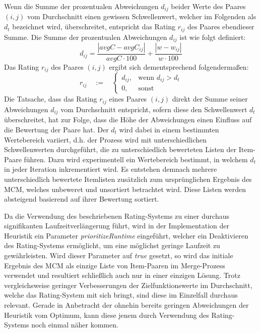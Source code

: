 Wenn die Summe der prozentualen Abweichungen $d_{ij}$ beider Werte des Paares $(i, j)$ vom Durchschnitt einen gewissen Schwellenwert,
welcher im Folgenden als  $d_t$ bezeichnet wird,
überschreitet, entspricht das Rating $r_{ij}$ des Paares ebendieser Summe.
Die Summe der prozentualen Abweichungen $d_{ij}$ ist wie folgt definiert:
\[ d_{ij} = \frac{|avgC - avgC_{ij}|}{avgC \cdot 100} + \frac{|w - w_{ij}|}{w \cdot 100}\]
Das Rating $r_{ij}$ des Paares $(i, j)$ ergibt sich dementsprechend folgendermaßen:
\[
    r_{ij} \quad := \quad
\begin{cases}
    d_{ij}, & \text{wenn $d_{ij} > d_t$}\\
    0, & \text{sonst}
\end{cases}
\]
Die Tatsache, dass das Rating $r_{ij}$ eines Paares $(i, j)$ direkt der Summe seiner Abweichungen $d_{ij}$
vom Durchschnitt entspricht, sofern diese den Schwellenwert $d_t$ überschreitet, hat zur Folge, dass die Höhe der Abweichungen
einen Einfluss auf die Bewertung der Paare hat. Der  $d_t$ wird dabei in einem bestimmten Wertebereich variiert, d.h. der Prozess wird mit unterschiedlichen Schwellenwerten durchgeführt, die zu unterschiedlich bewerteten Listen der Item-Paare führen. Dazu wird experimentell ein Wertebereich bestimmt, in welchem $d_t$ in jeder Iteration inkrementiert wird.
Es entstehen demnach mehrere unterschiedlich bewertete Itemlisten zusätzlich zum ursprünglichen Ergebnis des \textsc{MCM},
welches unbeweret und unsortiert betrachtet wird. Diese Listen werden absteigend basierend auf ihrer Bewertung sortiert.

\vfill
\pagebreak

Da die Verwendung des beschriebenen Rating-Systems zu einer durchaus signifikanten Laufzeitverlängerung führt,
wird in der Implementation der Heuristik ein Parameter \textit{prioritizeRuntime} eingeführt, welcher ein Deaktivieren des
Rating-Systems ermöglicht, um eine möglichst geringe Laufzeit zu gewährleisten. Wird dieser Parameter auf \textit{true}
gesetzt, so wird das initiale Ergebnis des \textsc{MCM} als einzige Liste von Item-Paaren im Merge-Prozess verwendet und
resultiert schließlich auch nur in einer einzigen Lösung.
Trotz vergleichsweise geringer Verbesserungen der Zielfunktionswerte im Durchschnitt, welche das Rating-System mit sich bringt,
sind diese im Einzelfall durchaus relevant. Gerade in Anbetracht der ohnehin bereits geringen Abweichungen der Heuristik vom Optimum,
kann diese jenem durch Verwendung des Rating-Systems noch einmal näher kommen.

